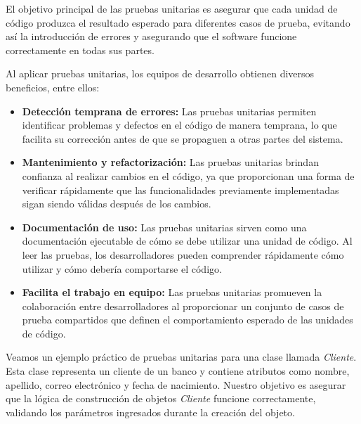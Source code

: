 \documentclass[executivepaper]{article}
\begin{document}
El objetivo principal de las pruebas unitarias es asegurar que cada unidad de código produzca el resultado esperado para diferentes casos de prueba, evitando así la introducción de errores y asegurando que el software funcione correctamente en todas sus partes.

Al aplicar pruebas unitarias, los equipos de desarrollo obtienen diversos beneficios, entre ellos:

\begin{itemize}
  \item \textbf{Detección temprana de errores:} Las pruebas unitarias permiten identificar problemas y defectos en el código de manera temprana, lo que facilita su corrección antes de que se propaguen a otras partes del sistema.
  \item \textbf{Mantenimiento y refactorización:} Las pruebas unitarias brindan confianza al realizar cambios en el código, ya que proporcionan una forma de verificar rápidamente que las funcionalidades previamente implementadas sigan siendo válidas después de los cambios.
  \item \textbf{Documentación de uso:} Las pruebas unitarias sirven como una documentación ejecutable de cómo se debe utilizar una unidad de código. Al leer las pruebas, los desarrolladores pueden comprender rápidamente cómo utilizar y cómo debería comportarse el código.
  \item \textbf{Facilita el trabajo en equipo:} Las pruebas unitarias promueven la colaboración entre desarrolladores al proporcionar un conjunto de casos de prueba compartidos que definen el comportamiento esperado de las unidades de código.
\end{itemize}

Veamos un ejemplo práctico de pruebas unitarias para una clase llamada \emph{Cliente}. Esta clase representa un cliente de un banco y contiene atributos como nombre, apellido, correo electrónico y fecha de nacimiento. Nuestro objetivo es asegurar que la lógica de construcción de objetos \emph{Cliente} funcione correctamente, validando los parámetros ingresados durante la creación del objeto.
\end{document}
